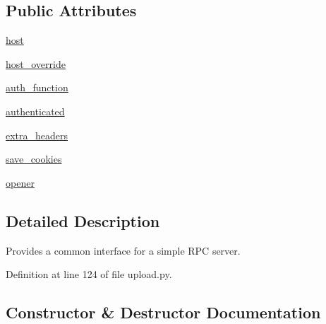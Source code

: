 \subsection*{Public Attributes}
\begin{DoxyCompactItemize}
\item 
\hyperlink{classupload_1_1_abstract_rpc_server_ab7188d827e2faddcf970f524f5856192}{host}
\item 
\hyperlink{classupload_1_1_abstract_rpc_server_a783a4a7e4ffb776a57a3f267300a213b}{host\+\_\+override}
\item 
\hyperlink{classupload_1_1_abstract_rpc_server_aee0090a3bcf07b913a7dd596a5dabb8f}{auth\+\_\+function}
\item 
\hyperlink{classupload_1_1_abstract_rpc_server_a692955750c802e461c6336d3000cd365}{authenticated}
\item 
\hyperlink{classupload_1_1_abstract_rpc_server_adbbf0109afc13d58d7815fa143cb779f}{extra\+\_\+headers}
\item 
\hyperlink{classupload_1_1_abstract_rpc_server_affe342205c4647d41b127f5a5634858b}{save\+\_\+cookies}
\item 
\hyperlink{classupload_1_1_abstract_rpc_server_aa931446476e0e86f3ade7fef0a0aea5a}{opener}
\end{DoxyCompactItemize}


\subsection{Detailed Description}
\begin{DoxyVerb}Provides a common interface for a simple RPC server.\end{DoxyVerb}
 

Definition at line 124 of file upload.\+py.



\subsection{Constructor \& Destructor Documentation}
